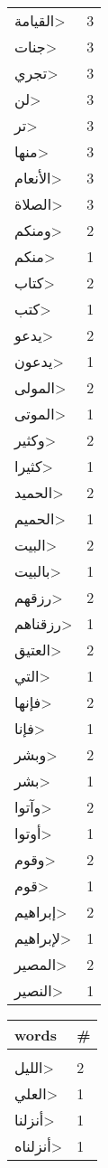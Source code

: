 \documentclass{article}
\begin{document}
\begin{multicols}{6}
\begin{center}
\begin{tabular}{ P{2cm}  P{1cm}}
\<القيامة> & 3 \\ 
\<جنات> & 3 \\ 
\<تجري> & 3 \\ 
\<لن> & 3 \\ 
\<تر> & 3 \\ 
\<منها> & 3 \\ 
\<الأنعام> & 3 \\ 
\<الصلاة> & 3 \\ 
\<ومنكم> & 2 \\ 
\<منكم> & 1 \\ 
\<كتاب> & 2 \\ 
\<كتب> & 1 \\ 
\<يدعو> & 2 \\ 
\<يدعون> & 1 \\ 
\<المولى> & 2 \\ 
\<الموتى> & 1 \\ 
\<وكثير> & 2 \\ 
\<كثيرا> & 1 \\ 
\<الحميد> & 2 \\ 
\<الحميم> & 1 \\ 
\<البيت> & 2 \\ 
\<بالبيت> & 1 \\ 
\<رزقهم> & 2 \\ 
\<رزقناهم> & 1 \\ 
\<العتيق> & 2 \\ 
\<التي> & 1 \\ 
\<فإنها> & 2 \\ 
\<فإنا> & 1 \\ 
\<وبشر> & 2 \\ 
\<بشر> & 1 \\ 
\<وآتوا> & 2 \\ 
\<أوتوا> & 1 \\ 
\<وقوم> & 2 \\ 
\<قوم> & 1 \\ 
\<إبراهيم> & 2 \\ 
\<لإبراهيم> & 1 \\ 
\<المصير> & 2 \\ 
\<النصير> & 1 \\ 
\end{tabular} 
\begin{tabular}{ P{2cm}  P{1cm}} 
\textbf{words}    & \textbf{\#}  \\
\hline
\\[0.01cm]
\<الليل> & 2 \\ 
\<العلي> & 1 \\ 
\<أنزلنا> & 1 \\ 
\<أنزلناه> & 1 \\ 

\end{tabular}
\end{center}
\end{multicols}
\end{document}
